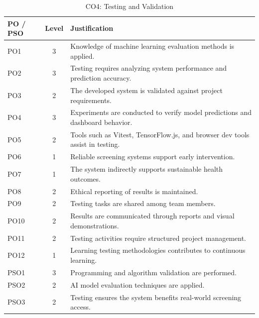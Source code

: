 \documentclass[12pt,a4paper]{report}
\begin{document}
\begin{table}[h!]
    \centering
    \caption{CO4: Testing and Validation}
    \renewcommand{\arraystretch}{1.3}
    \begin{tabularx}{\textwidth}{@{}l c X@{}}
        \toprule
        \textbf{PO / PSO} & \textbf{Level} & \textbf{Justification} \\
        \midrule
        PO1 & 3 & Knowledge of machine learning evaluation methods is applied. \\
        PO2 & 3 & Testing requires analyzing system performance and prediction accuracy. \\
        PO3 & 2 & The developed system is validated against project requirements. \\
        PO4 & 3 & Experiments are conducted to verify model predictions and dashboard behavior. \\
        PO5 & 2 & Tools such as Vitest, TensorFlow.js, and browser dev tools assist in testing. \\
        PO6 & 1 & Reliable screening systems support early intervention. \\
        PO7 & 1 & The system indirectly supports sustainable health outcomes. \\
        PO8 & 2 & Ethical reporting of results is maintained. \\
        PO9 & 2 & Testing tasks are shared among team members. \\
        PO10 & 2 & Results are communicated through reports and visual demonstrations. \\
        PO11 & 2 & Testing activities require structured project management. \\
        PO12 & 1 & Learning testing methodologies contributes to continuous learning. \\
        PSO1 & 3 & Programming and algorithm validation are performed. \\
        PSO2 & 2 & AI model evaluation techniques are applied. \\
        PSO3 & 2 & Testing ensures the system benefits real-world screening access. \\
        \bottomrule
    \end{tabularx}
\end{table}
\end{document}

